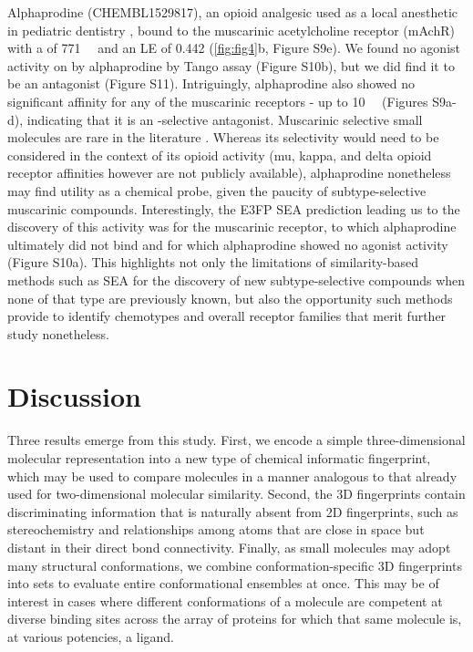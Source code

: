 \documentclass[../main.tex]{subfiles}
\begin{document}
\begin{refsection}
    Alphaprodine (CHEMBL1529817), an opioid analgesic used as a local anesthetic in pediatric dentistry \cite{moore_1988}, bound to the muscarinic acetylcholine receptor (mAchR)  with a  \Ki{} of \SI{771}{\nano\molar} and an LE of 0.442 \LEunit{} (\cref{fig:fig4}b, Figure S9e).
We found no agonist activity on   by alphaprodine by Tango assay  \cite{barnea_2008,kroeze_2015} (Figure S10b), but we did find it to be an antagonist (Figure S11).
Intriguingly, alphaprodine also showed no significant affinity for any of the muscarinic receptors  - up to \SI{10}{\micro\molar} (Figures S9a-d), indicating that it is an -selective antagonist.
Muscarinic  selective small molecules are rare in the literature \cite{gentry_2014}.
Whereas its  selectivity would need to be considered in the context of its opioid activity (mu, kappa, and delta opioid receptor affinities however are not publicly available), alphaprodine nonetheless may find utility as a   chemical probe, given the paucity of subtype-selective muscarinic compounds.
Interestingly, the E3FP SEA prediction leading us to the discovery of this activity was for the muscarinic  receptor, to which alphaprodine ultimately did not bind and for which alphaprodine showed no agonist activity  (Figure S10a).
This highlights not only the limitations of similarity-based methods such as SEA for the discovery of new subtype-selective compounds when none of that type are previously known, but also the opportunity such methods provide to identify chemotypes and overall receptor families that merit further study nonetheless.

\section{Discussion}

Three results emerge from this study.
First, we encode a simple three-dimensional molecular representation into a new type of chemical informatic fingerprint, which may be used to compare molecules in a manner analogous to that already used for two-dimensional molecular similarity.
Second, the 3D fingerprints contain discriminating information that is naturally absent from 2D fingerprints, such as stereochemistry and relationships among atoms that are close in space but distant in their direct bond connectivity.
Finally, as small molecules may adopt many structural conformations, we combine conformation-specific 3D fingerprints into sets to evaluate entire conformational ensembles at once.
This may be of interest in cases where different conformations of a molecule are competent at diverse binding sites across the array of proteins for which that same molecule is, at various potencies, a ligand.


\end{refsection}
\end{document}
